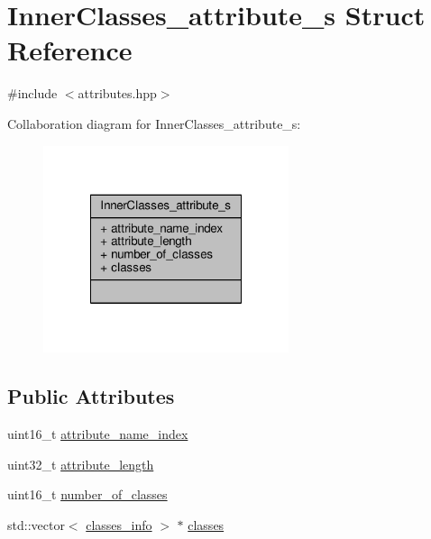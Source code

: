 \hypertarget{structInnerClasses__attribute__s}{\section{Inner\+Classes\+\_\+attribute\+\_\+s Struct Reference}
\label{structInnerClasses__attribute__s}
}


{\ttfamily \#include $<$attributes.\+hpp$>$}



Collaboration diagram for Inner\+Classes\+\_\+attribute\+\_\+s\+:\nopagebreak
\begin{figure}[H]
\begin{center}
\leavevmode
\includegraphics[width=204pt]{structInnerClasses__attribute__s__coll__graph}
\end{center}
\end{figure}
\subsection*{Public Attributes}
\begin{DoxyCompactItemize}
\item 
uint16\+\_\+t \hyperlink{structInnerClasses__attribute__s_a8ea7a6459f4a7ae27d23fa13d15b058c}{attribute\+\_\+name\+\_\+index}
\item 
uint32\+\_\+t \hyperlink{structInnerClasses__attribute__s_ab142de1a85a18b4fa3f49b77668fcd4f}{attribute\+\_\+length}
\item 
uint16\+\_\+t \hyperlink{structInnerClasses__attribute__s_ad5b6fc395dfe3380ec6a16df0cc618a4}{number\+\_\+of\+\_\+classes}
\item 
std\+::vector$<$ \hyperlink{attributes_8hpp_ade4d95a56a50512b3a546ee948651078}{classes\+\_\+info} $>$ $\ast$ \hyperlink{structInnerClasses__attribute__s_a3461afb1424fa780c0ac8053ead725f7}{classes}
\end{DoxyCompactItemize}



